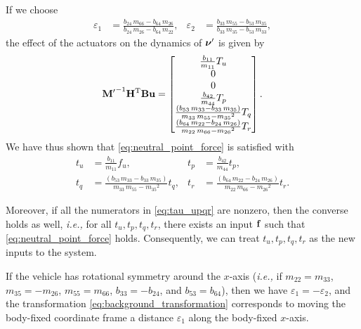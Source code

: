 If we choose
\begin{align}
    \varepsilon_1 &= \frac{b_{24}\,m_{66}-b_{64}\,m_{26}}{b_{24}\,m_{26}-b_{64}\,m_{22}}, &
    \varepsilon_2 &= \frac{b_{33}\,m_{55}-b_{53}\,m_{35}}{b_{33}\,m_{35}-b_{53}\,m_{33}},
\end{align}
the effect of the actuators on the dynamics of $\bm{\nu}^{\prime}$ is given by
\begin{equation}
    {\mathbf{M}^{\prime}}^{-1}\mathbf{H}^{\mathrm{T}}\mathbf{B}\mathbf{u} =
    \begin{bmatrix}
        \frac{b_{11}}{m_{11}} T_{u} \\
        0 \\ 
        0 \\ 
        \frac{b_{42}}{m_{44}} T_{p} \\ 
        \frac{\left(b_{53}\,m_{33}-b_{33}\,m_{35}\right)}{m_{33}\,m_{55}-{m_{35}}^2} T_{q} \\ 
        \frac{\left(b_{64}\,m_{22}-b_{24}\,m_{26}\right)}{m_{22}\,m_{66}-{m_{26}}^2} T_{r}
    \end{bmatrix}.
\end{equation}
We have thus shown that \eqref{eq:neutral_point_force} is satisfied with
\begin{subequations}
    \begin{align}
        t_u &= \frac{b_{11}}{m_{11}} f_{u}, &
        t_p &= \frac{b_{42}}{m_{44}} t_{p}, \\
        t_q &= \frac{\left(b_{53}\,m_{33}-b_{33}\,m_{35}\right)}{m_{33}\,m_{55}-{m_{35}}^2} t_{q}, &
        t_r &= \frac{\left(b_{64}\,m_{22}-b_{24}\,m_{26}\right)}{m_{22}\,m_{66}-{m_{26}}^2} t_{r}.
    \end{align} 
    \label{eq:tau_upqr}
\end{subequations}

\noindent Moreover, if all the numerators in \eqref{eq:tau_upqr} are nonzero, then the converse holds as well, \emph{i.e.,} for all $t_u, t_p, t_q, t_r$, there exists an input $\mathbf{f}$ such that \eqref{eq:neutral_point_force} holds.
Consequently, we can treat $t_u, t_p, t_q, t_r$ as the new inputs to the system.

\begin{rmk}
    If the vehicle has rotational symmetry around the $x$-axis (\emph{i.e.,} if $m_{22} = m_{33}$, $m_{35} = -m_{26}$, $m_{55} = m_{66}$, $b_{33} = -b_{24}$, and $b_{53} = b_{64}$), then we have $\varepsilon_1 = -\varepsilon_2$, and the transformation \eqref{eq:background_transformation} corresponds to moving the body-fixed coordinate frame a distance $\varepsilon_1$ along the body-fixed $x$-axis.
\end{rmk}

